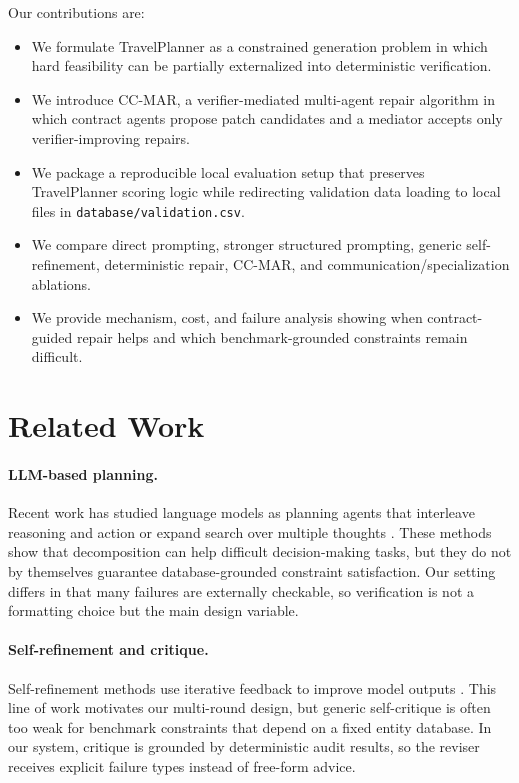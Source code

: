 \documentclass{article}
\begin{document}
Our contributions are:
\begin{itemize}[leftmargin=1.5em]
    \item We formulate TravelPlanner as a constrained generation problem in which hard feasibility can be partially externalized into deterministic verification.
    \item We introduce CC-MAR, a verifier-mediated multi-agent repair algorithm in which contract agents propose patch candidates and a mediator accepts only verifier-improving repairs.
    \item We package a reproducible local evaluation setup that preserves TravelPlanner scoring logic while redirecting validation data loading to local files in \texttt{database/validation.csv}.
    \item We compare direct prompting, stronger structured prompting, generic self-refinement, deterministic repair, CC-MAR, and communication/specialization ablations.
    \item We provide mechanism, cost, and failure analysis showing when contract-guided repair helps and which benchmark-grounded constraints remain difficult.
\end{itemize}

\section{Related Work}
\paragraph{LLM-based planning.}
Recent work has studied language models as planning agents that interleave reasoning and action \citep{yao2023react} or expand search over multiple thoughts \citep{yao2023treeofthoughts}. These methods show that decomposition can help difficult decision-making tasks, but they do not by themselves guarantee database-grounded constraint satisfaction. Our setting differs in that many failures are externally checkable, so verification is not a formatting choice but the main design variable.

\paragraph{Self-refinement and critique.}
Self-refinement methods use iterative feedback to improve model outputs \citep{madaan2023selfrefine,shinn2023reflexion}. This line of work motivates our multi-round design, but generic self-critique is often too weak for benchmark constraints that depend on a fixed entity database. In our system, critique is grounded by deterministic audit results, so the reviser receives explicit failure types instead of free-form advice.
\end{document}
